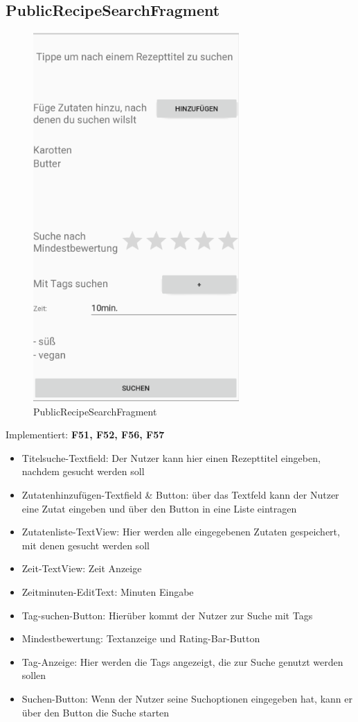 \subsection{PublicRecipeSearchFragment}
\begin{figure}[H]
	\centering
	\includegraphics[width=0.7\textwidth]{pics/publicRecipeSearchFragment.png}%
	\caption{PublicRecipeSearchFragment}%
	\label{view}%
\end{figure}
Implementiert: \textbf{F51, F52, F56, F57}
\begin{itemize}[nosep]
\item	Titelsuche-Textfield: Der Nutzer kann hier einen Rezepttitel eingeben, nachdem gesucht werden soll
\item	Zutatenhinzufügen-Textfield \& Button: über das Textfeld kann der Nutzer eine Zutat eingeben und über den Button in eine Liste eintragen

\item	Zutatenliste-TextView: Hier werden alle eingegebenen Zutaten gespeichert, mit denen gesucht werden soll

\item Zeit-TextView: Zeit Anzeige
\item Zeitminuten-EditText: Minuten Eingabe
\item	Tag-suchen-Button: Hierüber kommt der Nutzer zur Suche mit Tags
\item Mindestbewertung: Textanzeige und Rating-Bar-Button
\item	Tag-Anzeige: Hier werden die Tags angezeigt, die zur Suche genutzt werden sollen 
\item	Suchen-Button: Wenn der Nutzer seine Suchoptionen eingegeben hat, kann er über den Button die Suche starten
\end{itemize}


